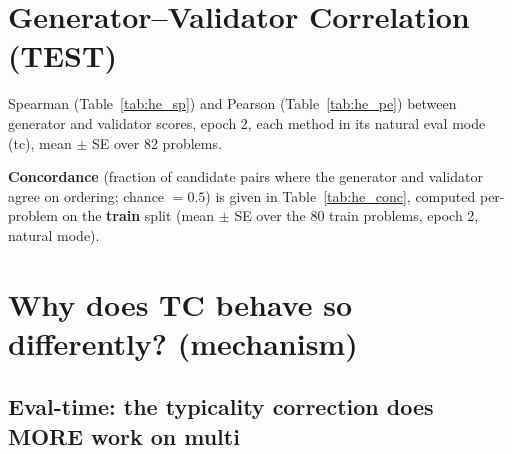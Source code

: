 \documentclass[11pt,a4paper]{article}
\begin{document}
\section{Generator--Validator Correlation (TEST)}

Spearman (Table~\ref{tab:he_sp}) and Pearson (Table~\ref{tab:he_pe}) between generator and
validator scores, epoch 2, each method in its natural eval mode (tc), mean $\pm$ SE over 82
problems.

\begin{table}[H]
\centering
\caption{Spearman $\rho$ (gen vs val), tc, $\times100$.}
\label{tab:he_sp}

\end{table}

\begin{table}[H]
\centering
\caption{Pearson $r$ (gen vs val), tc, $\times100$.}
\label{tab:he_pe}

\end{table}

\textbf{Concordance} (fraction of candidate pairs where the generator and validator agree on
ordering; chance $=0.5$) is given in Table~\ref{tab:he_conc}, computed per-problem on the
\textbf{train} split (mean $\pm$ SE over the 80 train problems, epoch 2, natural mode).

\begin{table}[H]
\centering
\caption{Generator--validator concordance ($\times100$), per-problem TRAIN, epoch 2.
Rises monotonically with method strength (Base $\to$ RankAlign $\to$ +fsx $\to$ +TC), with
FLORA-Neg/PMI highest --- the generator and validator rankings become most aligned under TC.}
\label{tab:he_conc}

\end{table}

\section{Why does TC behave so differently? (mechanism)}

\subsection{Eval-time: the typicality correction does MORE work on multi}
\end{document}
